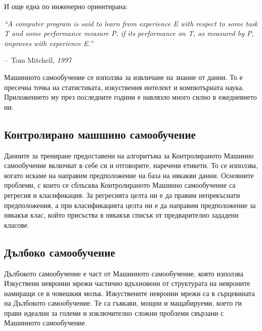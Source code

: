 \documentclass{article}
\makeatletter
\newenvironment{chapquote}[2][2em]
{\setlength{\@tempdima}{#1}%
\def\chapquote@author{#2}%
\parshape 1 \@tempdima \dimexpr\textwidth-2\@tempdima\relax%
\itshape}
{\par\normalfont\hfill--\ \chapquote@author\hspace*{\@tempdima}\par\bigskip}
\makeatother
\begin{document}
    И още една по инженерно ориентирана:

    \begin{chapquote}{Tom Mitchell, \textit{1997} \cite{hands-on-ml}}
        ``A computer program is said to learn from experience E with respect to some task T and some performance measure P,
        if its performance on T, as measured by P, improves with experience E.''
    \end{chapquote}

    Машинното самообучение се използва за извличане на знание от данни. То е пресечна точка на статистиката, изкуствения
    интелект и компютърната наука. Приложението му през последните години е навлязло много силно в ежедневието ни.
    \cite{intro-to-ml}

    \subsection{Контролирано машшино самообучение}

    Данните за трениране предоставени на алгоритъма за Контролираното Машинно самообучение включват в себе си и отговорите,
    наречени етикети. \cite{hands-on-ml} То се използва, когато искаме на направим предположение на база на някакви данни.
    Основните проблеми, с които се сблъсква Контролираното Машинно самообучение са регресия и класификация. За регресията
    целта ни е да правим непрекъснати предположения, а при класификацията целта ни е да направим предположение за някакъв
    клас, който присъства в някакъв списък от предварително зададени класове. \cite{intro-to-ml}

    \subsection{Дълбоко самообучение}

    Дълбокото самообучение е част от Машинното самообучение, която използва Изкуствени невронни мрежи частично вдъхновени
    от структурата на невроните намиращи се в човешкия мозък. \cite{deep-learning-keras} Изкуствените невронни мрежи са в
    сърцевината на Дълбокото самообучение. Те са гъвкави, мощни и мащабируеми, което ги прави идеални за големи и
    изключително сложни проблеми свързани с Машинното самообучение. \cite{hands-on-ml}
\end{document}
